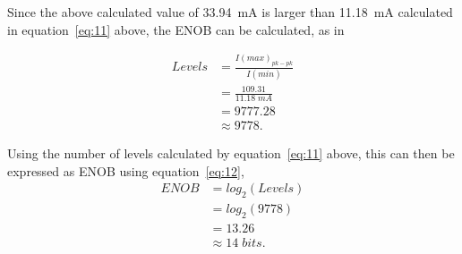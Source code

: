Since the above calculated value of \qty{33.94}{\mA} is larger than \qty{11.18}{\mA} calculated in equation~\ref{eq:11} above, the ENOB can be calculated, as in

\begin{equation}
\label{eq:11}
\begin{split}
    Levels  &= \frac{I(max)_{pk-pk}}{I(min)} \\
            &= \frac{109.31}{11.18 \; mA} \\
            &= 9777.28\\
            &\approx 9778.
\end{split}
\end{equation}

Using the number of levels calculated by equation~\ref{eq:11} above, this can then be expressed as ENOB using equation~\ref{eq:12},
\begin{equation}
\label{eq:12}
\begin{split}
    ENOB    &= log_{2}(Levels) \\
            &= log_{2}(9778) \\
            &= 13.26\\
            &\approx 14\; bits.
\end{split}
\end{equation}

